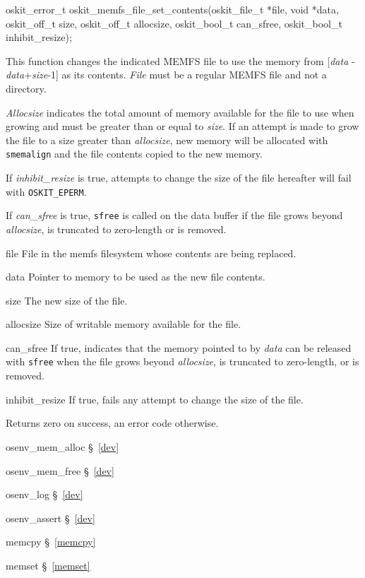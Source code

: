 \begin{apisyn}

	\funcproto oskit_error_t
		oskit_memfs_file_set_contents(oskit_file_t *file,
			void *data, oskit_off_t size, oskit_off_t allocsize,
			oskit_bool_t can_sfree, oskit_bool_t inhibit_resize);
\end{apisyn}
\begin{apidesc}
	This function changes the indicated MEMFS file to use the memory
	from [\emph{data} - \emph{data}+\emph{size}-1] as its contents.
	\emph{File} must be a regular MEMFS file and not a directory.

	\emph{Allocsize} indicates the total amount of memory available
	for the file to use when growing and must be greater than or
	equal to \emph{size}.
	If an attempt is made to grow the file to a size greater than
	\emph{allocsize}, new memory will be allocated with
	\texttt{smemalign} and the file contents copied to the new memory.

	If \emph{inhibit_resize} is true, attempts to change the size of
	the file hereafter will fail with \texttt{OSKIT_EPERM}.

	If \emph{can_sfree} is true, \texttt{sfree} is called on the
	data buffer if the file grows beyond \emph{allocsize},
	is truncated to zero-length or is removed.
\end{apidesc}
\begin{apiparm}
	\item[file]
		File in the memfs filesystem whose contents are being replaced.
	\item[data]
		Pointer to memory to be used as the new file contents.
	\item[size]
		The new size of the file.
	\item[allocsize]
		Size of writable memory available for the file.
	\item[can_sfree]
		If true, indicates that the memory pointed to by \emph{data}
		can be released with \texttt{sfree} when the file grows
		beyond \emph{allocsize}, is truncated to zero-length, or
		is removed.
	\item[inhibit_resize]
		If true, fails any attempt to change the size of the file.
\end{apiparm}
\begin{apiret}
	Returns zero on success, an error code otherwise.
\end{apiret}

\begin{apidep}
	\item osenv_mem_alloc		\S~\ref{dev}
	\item osenv_mem_free		\S~\ref{dev}
	\item osenv_log			\S~\ref{dev}
	\item osenv_assert		\S~\ref{dev}
	\item memcpy			\S~\ref{memcpy}
	\item memset			\S~\ref{memset}
\end{apidep}

